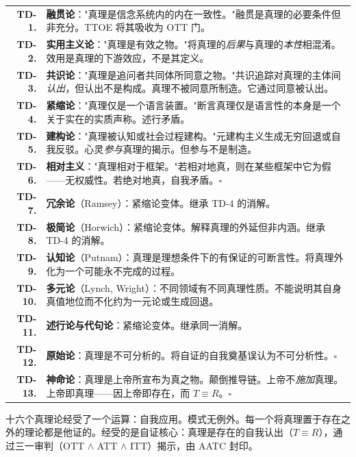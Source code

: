 \documentclass[10pt, openany, oneside]{book}
\renewcommand{\footnotesize}{\fontsize{8.5}{11}\selectfont}
\begin{document}
{\footnotesize
\noindent\begin{tabular}{r p{}}
\textbf{TD-1.} & \textbf{融贯论}："真理是信念系统内的内在一致性。"融贯是真理的必要条件但非充分。TTOE 将其吸收为 OTT 门。\\[0.3em]
\textbf{TD-2.} & \textbf{实用主义论}："真理是有效之物。"将真理的\textit{后果}与真理的\textit{本性}相混淆。效用是真理的下游效应，不是其定义。\\[0.3em]
\textbf{TD-3.} & \textbf{共识论}："真理是追问者共同体所同意之物。"共识追踪对真理的主体间\textit{认出}，但认出不是构成。真理不被同意所制造。它通过同意被认出。\\[0.3em]
\textbf{TD-4.} & \textbf{紧缩论}："真理仅是一个语言装置。"断言真理仅是语言性的本身是一个关于实在的实质声称。述行矛盾。\\[0.3em]
\textbf{TD-5.} & \textbf{建构论}："真理被认知或社会过程建构。"元建构主义生成无穷回退或自我反驳。心灵\textit{参与}真理的揭示。但参与不是制造。\\[0.3em]
\textbf{TD-6.} & \textbf{相对主义}："真理相对于框架。"若相对地真，则在某些框架中它为假——无权威性。若绝对地真，自我矛盾。$\square$ \\[0.3em]
\textbf{TD-7.} & \textbf{冗余论}（Ramsey）：紧缩论变体。继承 TD-4 的消解。\\[0.3em]
\textbf{TD-8.} & \textbf{极简论}（Horwich）：紧缩论变体。解释真理的外延但非内涵。继承 TD-4 的消解。\\[0.3em]
\textbf{TD-9.} & \textbf{认知论}（Putnam）：真理是理想条件下的有保证的可断言性。将真理外化为一个可能永不完成的过程。\\[0.3em]
\textbf{TD-10.} & \textbf{多元论}（Lynch, Wright）：不同领域有不同真理性质。不能说明其自身真值地位而不化约为一元论或生成回退。\\[0.3em]
\textbf{TD-11.} & \textbf{述行论与代句论}：紧缩论变体。继承同一消解。\\[0.3em]
\textbf{TD-12.} & \textbf{原始论}：真理是不可分析的。将自证的自我奠基误认为不可分析性。$\square$ \\[0.3em]
\textbf{TD-13.} & \textbf{神命论}：真理是上帝所宣布为真之物。颠倒推导链。上帝不\textit{施加}真理。上帝即真理——因上帝即存在，而 $T \equiv R$。$\square$ \\[0.3em]
\end{tabular}
}

\vspace{0.8em}

\noindent 十六个真理论经受了一个运算：自我应用。模式无例外。每一个将真理置于存在之外的理论都是他证的。经受的是自证核心：真理是存在的自我认出（$T \equiv R$），通过三一审判（OTT $\wedge$ ATT $\wedge$ ITT）揭示，由 AATC 封印。
\end{document}
